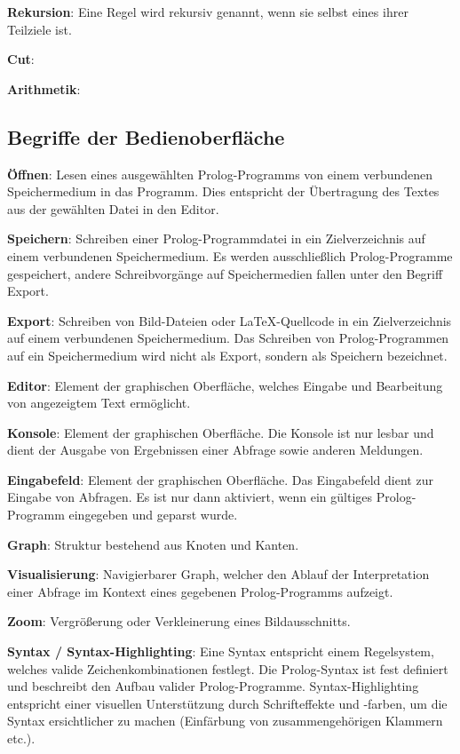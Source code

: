 \documentclass[parskip=full,11pt,twoside]{scrartcl}
\begin{document}
\textbf{Rekursion}:
Eine Regel wird rekursiv genannt, wenn sie selbst eines ihrer Teilziele ist.

\textbf{Cut}:

\textbf{Arithmetik}:

\subsection{Begriffe der Bedienoberfläche}
\textbf{Öffnen}:
Lesen eines ausgewählten Prolog-Programms von einem verbundenen Speichermedium in das Programm. Dies entspricht der Übertragung des Textes aus der gewählten Datei in den Editor.

\textbf{Speichern}:
Schreiben einer Prolog-Programmdatei in ein Zielverzeichnis auf einem verbundenen Speichermedium. Es werden ausschließlich Prolog-Programme gespeichert, andere Schreibvorgänge auf Speichermedien fallen unter den Begriff Export.

\textbf{Export}:
Schreiben von Bild-Dateien oder LaTeX-Quellcode in ein Zielverzeichnis auf einem verbundenen Speichermedium. Das Schreiben von Prolog-Programmen auf ein Speichermedium wird nicht als Export, sondern als Speichern bezeichnet.

\textbf{Editor}:
Element der graphischen Oberfläche, welches Eingabe und Bearbeitung von angezeigtem Text ermöglicht.

\textbf{Konsole}:
Element der graphischen Oberfläche. Die Konsole ist nur lesbar und dient der Ausgabe von Ergebnissen einer Abfrage sowie anderen Meldungen. 

\textbf{Eingabefeld}:
Element der graphischen Oberfläche. Das Eingabefeld dient zur Eingabe von Abfragen. Es ist nur dann aktiviert, wenn ein gültiges Prolog-Programm eingegeben und geparst wurde.

\textbf{Graph}:
Struktur bestehend aus Knoten und Kanten.

\textbf{Visualisierung}:
Navigierbarer Graph, welcher den Ablauf der Interpretation einer Abfrage im Kontext eines gegebenen Prolog-Programms aufzeigt.

\textbf{Zoom}:
Vergrößerung oder Verkleinerung eines Bildausschnitts.

\textbf{Syntax / Syntax-Highlighting}:
Eine Syntax entspricht einem Regelsystem, welches valide Zeichenkombinationen festlegt. Die Prolog-Syntax ist fest definiert und beschreibt den Aufbau valider Prolog-Programme. Syntax-Highlighting entspricht einer visuellen Unterstützung durch Schrifteffekte und -farben, um die Syntax ersichtlicher zu machen (Einfärbung von zusammengehörigen Klammern etc.).
\end{document}
